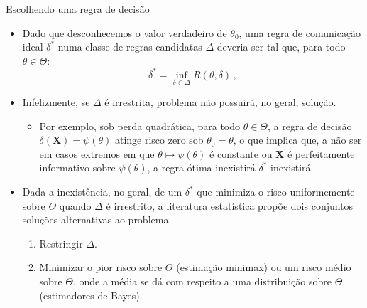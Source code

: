 \documentclass[11pt]{beamer}
\begin{document}
	
	\begin{frame}{Escolhendo uma regra de decisão}
		\begin{itemize}
			\item Dado que desconhecemos o valor verdadeiro de $\theta_0$, uma regra de comunicação ideal $\delta^*$ numa classe de regras candidatas $\Delta$ deveria ser tal que, para todo $\theta \in \Theta$:
			$$\delta^* = \inf_{\delta \in \Delta}R(\theta,\delta)\, ,$$
			\item Infelizmente, se $\Delta$ é irrestrita, problema não possuirá, no geral, solução.
			\begin{itemize}
				\item Por exemplo, sob perda quadrática, para todo $\theta \in \Theta$, a regra de decisão $\delta(\boldsymbol{X}) = \psi(\theta)$ atinge risco zero sob $\theta_0=\theta$, o que implica que, a não ser em casos extremos em que $\theta \mapsto \psi(\theta)$ é constante ou $\boldsymbol{X}$ é perfeitamente informativo sobre $\psi(\theta)$, a regra ótima inexistirá $\delta^*$ inexistirá.
			\end{itemize}
			\item Dada a inexistência, no geral, de um $\delta^*$ que minimiza o risco uniformemente sobre $\Theta$ quando $\Delta$ é irrestrito, a literatura estatística propõe dois conjuntos soluções alternativas ao problema
			\begin{enumerate}
				\item Restringir $\Delta$.
				\item Minimizar o pior risco sobre $\Theta$ (estimação minimax) ou um risco médio sobre $\Theta$, onde a média se dá com respeito a uma distribuição sobre $\Theta$ (estimadores de Bayes). 
			\end{enumerate}
		\end{itemize}
	\end{frame}
\end{document}
